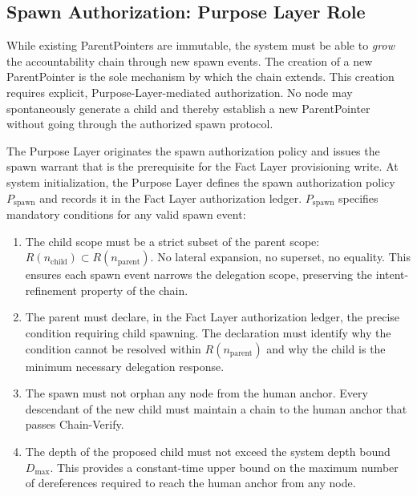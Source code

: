 \subsection{Spawn Authorization: Purpose Layer Role}
\label{sec:spawn-auth}

While existing ParentPointers are immutable, the system must be able to \textit{grow} the accountability chain through new spawn events. The creation of a new ParentPointer is the sole mechanism by which the chain extends. This creation requires explicit, Purpose-Layer-mediated authorization. No node may spontaneously generate a child and thereby establish a new ParentPointer without going through the authorized spawn protocol.

The Purpose Layer originates the spawn authorization policy and issues the spawn warrant that is the prerequisite for the Fact Layer provisioning write. At system initialization, the Purpose Layer defines the spawn authorization policy $P_{\mathrm{spawn}}$ and records it in the Fact Layer authorization ledger. $P_{\mathrm{spawn}}$ specifies mandatory conditions for any valid spawn event:

\begin{enumerate}
    \item[(S1) \textbf{Scope refinement.}] The child scope must be a strict subset of the parent scope: $R(n_{\mathrm{child}}) \subset R(n_{\mathrm{parent}})$. No lateral expansion, no superset, no equality. This ensures each spawn event narrows the delegation scope, preserving the intent-refinement property of the chain.

    \item[(S2) \textbf{Operational necessity.}] The parent must declare, in the Fact Layer authorization ledger, the precise condition requiring child spawning. The declaration must identify why the condition cannot be resolved within $R(n_{\mathrm{parent}})$ and why the child is the minimum necessary delegation response.

    \item[(S3) \textbf{Human anchor preservation.}] The spawn must not orphan any node from the human anchor. Every descendant of the new child must maintain a chain to the human anchor that passes Chain-Verify.

    \item[(S4) \textbf{Depth bound compliance.}] The depth of the proposed child must not exceed the system depth bound $D_{\max}$. This provides a constant-time upper bound on the maximum number of dereferences required to reach the human anchor from any node.
\end{enumerate}

